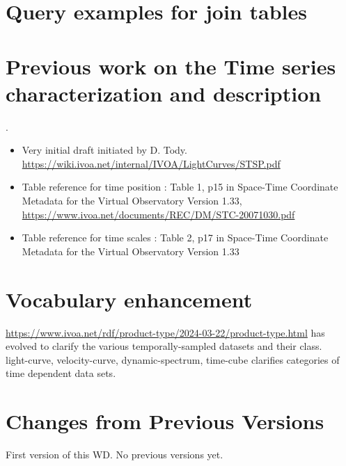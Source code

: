 \documentclass[11pt,a4paper]{ivoa}
\begin{document}


\appendix


\section{Query examples for join tables}\label{sec:query_examples}




\section{Previous work on the Time series characterization and description}.

\begin{itemize}
\item Very initial draft initiated by D. Tody. \url{https://wiki.ivoa.net/internal/IVOA/LightCurves/STSP.pdf}
\item Table reference for time position : Table 1, p15 in Space-Time Coordinate Metadata for the Virtual Observatory
Version 1.33, \url{https://www.ivoa.net/documents/REC/DM/STC-20071030.pdf}
\item Table reference for time scales :  Table 2, p17 in Space-Time Coordinate Metadata for the Virtual Observatory
Version 1.33
\end{itemize}

\section{Vocabulary enhancement}
 \url{https://www.ivoa.net/rdf/product-type/2024-03-22/product-type.html}
has evolved to clarify the various temporally-sampled datasets and their class.\\
light-curve, velocity-curve, dynamic-spectrum, time-cube clarifies categories of time dependent data sets.

\section{Changes from Previous Versions}

First version of this WD.
No previous versions yet.
\end{document}
